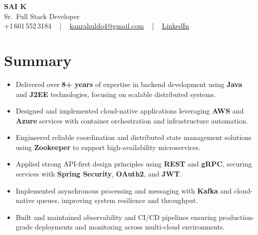 \documentclass[letterpaper,11pt]{article}
\newcommand{\resumeItem}[1]{
  \item\footnotesize{
    {#1 \vspace{-2pt}}
  }
}
\newcommand{\resumeItemListStart}{\begin{itemize}[leftmargin=*]}
\newcommand{\resumeItemListEnd}{\end{itemize}\vspace{-5pt}}
\begin{document}
\begin{center}
    {\fontsize{14pt}{12pt}\selectfont \textbf{\MakeUppercase{Sai K}}}\\ \vspace{2pt}
    \fontsize{10pt}{12pt}\selectfont Sr.\ Full Stack Developer\\ \vspace{2pt}
    \fontsize{10pt}{12pt}\selectfont +1\,601\,552\,3184 ~ | ~
    \href{mailto:kanrahuldo4@gmail.com}{kanrahuldo4@gmail.com} ~ | ~
    \href{https://www.linkedin.com/in/srrrk/}{\color{blue}\underline{LinkedIn}}
    \vspace{-10pt}
\end{center}

\section{Summary}
\fontsize{9pt}{10pt}\selectfont
\resumeItemListStart
  \resumeItem{Delivered over \textbf{8+ years} of expertise in backend development using \textbf{Java} and \textbf{J2EE} technologies, focusing on scalable distributed systems.}
  \resumeItem{Designed and implemented cloud-native applications leveraging \textbf{AWS} and \textbf{Azure} services with container orchestration and infrastructure automation.}
  \resumeItem{Engineered reliable coordination and distributed state management solutions using \textbf{Zookeeper} to support high-availability microservices.}
  \resumeItem{Applied strong API-first design principles using \textbf{REST} and \textbf{gRPC}, securing services with \textbf{Spring Security}, \textbf{OAuth2}, and \textbf{JWT}.}
  \resumeItem{Implemented asynchronous processing and messaging with \textbf{Kafka} and cloud-native queues, improving system resilience and throughput.}
  \resumeItem{Built and maintained observability and CI/CD pipelines ensuring production-grade deployments and monitoring across multi-cloud environments.}
\resumeItemListEnd
\vspace{-6pt}

\end{document}
